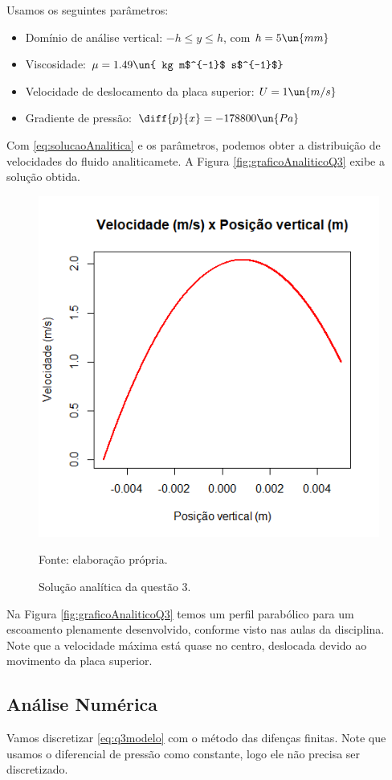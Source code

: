 Usamos os seguintes parâmetros:

\begin{itemize}
    \item Domínio de análise vertical: $-h \leq y \leq h$, com $h = 5 \un{mm}$
    \item Viscosidade: $\mu=1.49 \un{ kg m$^{-1}$ s$^{-1}$}$
    \item Velocidade de deslocamento da placa superior: $U=1 \un{m/s}$
    \item Gradiente de pressão: $\diff{p}{x} = -178800 \un{Pa}$
\end{itemize}

Com \eqref{eq:solucaoAnalitica} e os parâmetros, podemos obter a distribuição de velocidades
do fluido analiticamete. A Figura \eqref{fig:graficoAnaliticoQ3} exibe a solução obtida.

\begin{figure}[h!]
    \caption{Solução analítica da questão 3.}
    \label{fig:graficoAnaliticoQ3}
    \centering
    \centerline{\includegraphics[scale=0.7]{graficoAnaliticoQ3.png}}
    \par{Fonte: elaboração própria.}
\end{figure}

Na Figura \eqref{fig:graficoAnaliticoQ3} temos um perfil parabólico para um escoamento plenamente
desenvolvido, conforme visto nas aulas da disciplina. Note que a velocidade máxima está quase no centro,
deslocada devido ao movimento da placa superior.

\subsection{Análise Numérica}

Vamos discretizar \eqref{eq:q3modelo} com o método das difenças finitas. Note que
usamos o diferencial de pressão como constante, logo ele não precisa ser discretizado.



